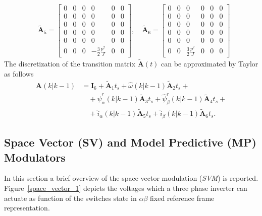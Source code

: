 \documentclass[11pt,a4paper,oneside]{book}
\numberwithin{equation}{section}
\theoremstyle{it}
\theoremstyle{definition}
\begin{document}
\begin{equation}
	\begin{aligned}
		&\tilde{\mathbf{A}}_5 = 
		\begin{bmatrix} 
			0 & 0 & 0 & 0 & 0 & 0 \\[6pt]			
			0 & 0 & 0 & 0 & 0 & 0 \\[6pt]
			0 & 0 & 0 & 0 & 0 & 0 \\[6pt]
			0 & 0 & 0 & 0 & 0 & 0 \\[6pt]
			0 & 0 & 0 & 0 & 0 & 0 \\[6pt]
			0 & 0 & 0 & -\frac{3}{2}\frac{p^2}{J} & 0 & 0
		\end{bmatrix},\quad
		\tilde{\mathbf{A}}_6 = 
		\begin{bmatrix} 
			0 & 0 & 0 & 0 & 0 & 0 \\[6pt]			
			0 & 0 & 0 & 0 & 0 & 0 \\[6pt]
			0 & 0 & 0 & 0 & 0 & 0 \\[6pt]
			0 & 0 & 0 & 0 & 0 & 0 \\[6pt]
			0 & 0 & 0 & 0 & 0 & 0 \\[6pt]
			0 & 0 & \frac{3}{2}\frac{p^2}{J} & 0 & 0 & 0
		\end{bmatrix} 
	\end{aligned}
\end{equation} 
The discretization of the transition matrix $\tilde{\mathbf{A}}(t)$ can be 
approximated by Taylor as follows
\begin{equation}\label{}
	\begin{aligned}
		{\mathbf{A}}(k|k-1) &= \mathbf{I}_6 + \tilde{\mathbf{A}}_1t_s + 
		\hat{\omega}(k|k-1) \tilde{\mathbf{A}}_2t_s +\\[8pt]
		&\quad + \hat{\psi}_\alpha^r(k|k-1) \tilde{\mathbf{A}}_3t_s  + \hat{\psi}_\beta^r(k|k-1) \tilde{\mathbf{A}}_4t_s +\\[8pt]
		&\quad + \hat{i}_\alpha(k|k-1) \tilde{\mathbf{A}}_5t_s + \hat{i}_\beta(k|k-1) \tilde{\mathbf{A}}_6t_s.
	\end{aligned}
\end{equation}

\subsection{Space Vector (SV) and Model Predictive (MP) Modulators}	
In this section a brief overview of the space vector modulation (\textit{SVM}) is reported.  Figure~\ref{space_vector_1} depicts the voltages which a three phase inverter can actuate as function of the switches state in $\alpha\beta$ fixed reference frame representation.
\end{document}
